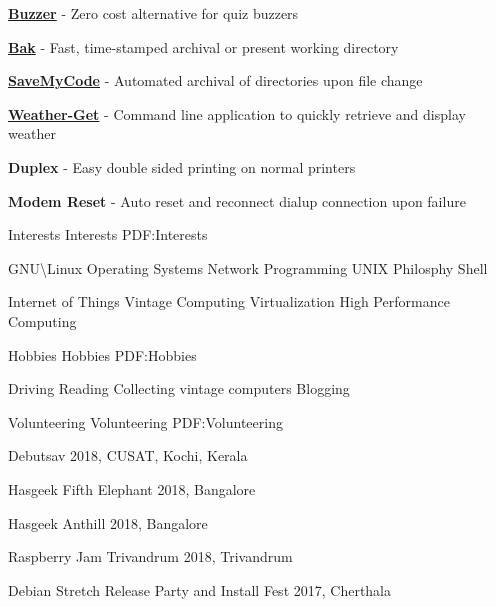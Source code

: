 \documentclass[letterpaper,MMMyyyy,nonstopmode]{simpleresumecv}
\begin{document}
\begin{Body}
\BigGap
\BulletItem
\href{https://github.com/karuvally/buzzer}
{\textbf{Buzzer}} - Zero cost alternative for quiz buzzers
\hfill
{}

\BigGap
\BulletItem
\href{https://github.com/karuvally/bak}
{\textbf{Bak}} - Fast, time-stamped archival or present working directory
\hfill
{}

\BigGap
\BulletItem
\href{https://github.com/karuvally/SaveMyCode}
{\textbf{SaveMyCode}} - Automated archival of directories upon file change
\hfill
{}

\BigGap
\BulletItem
\href{https://github.com/karuvally/weather-get}
{\textbf{Weather-Get}} - Command line application to quickly retrieve and display
weather
\hfill
{}

\BigGap
\BulletItem
{\textbf{Duplex}} - Easy double sided printing on normal printers
\hfill
{}

\BigGap
\BulletItem
{\textbf{Modem Reset}} - Auto reset and reconnect dialup connection upon failure
\hfill
{}


\BigGap
\Section
{Interests}
{Interests}
{PDF:Interests}

\Entry
GNU\textbackslash Linux \textbullet{} Operating Systems \textbullet{}
Network Programming \textbullet{} UNIX Philosphy \textbullet{} Shell

\Gap
\Entry
Internet of Things \textbullet{} Vintage Computing \textbullet{}
Virtualization \textbullet{} High Performance Computing


\BigGap
\Section
{Hobbies}
{Hobbies}
{PDF:Hobbies}

\Entry
Driving \textbullet{} Reading \textbullet{} Collecting vintage computers
\textbullet{} Blogging


\BigGap
\Section
{Volunteering}
{Volunteering}
{PDF:Volunteering}

\BulletItem
Debutsav 2018, CUSAT, Kochi, Kerala

\BigGap
\BulletItem
Hasgeek Fifth Elephant 2018, Bangalore

\BigGap
\BulletItem
Hasgeek Anthill 2018, Bangalore 

\BigGap
\BulletItem
Raspberry Jam Trivandrum 2018, Trivandrum

\BigGap
\BulletItem
Debian Stretch Release Party and Install Fest 2017, Cherthala


\end{Body}
\end{document}
